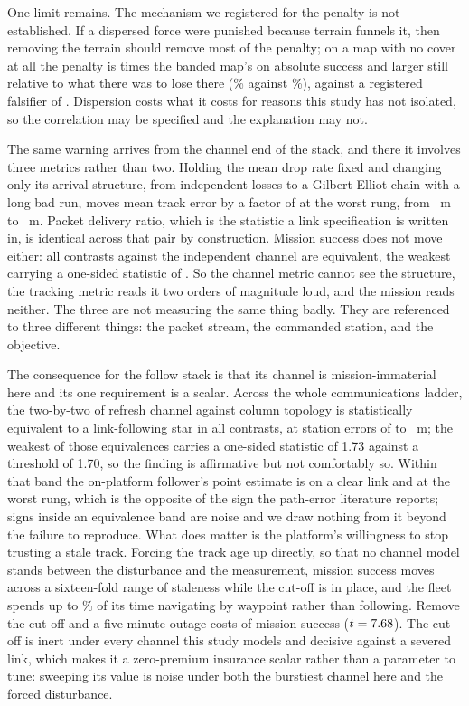\documentclass[11pt]{article}
\begin{document}
One limit remains. The mechanism we registered for the penalty is not established. If a
dispersed force were punished because terrain funnels it, then removing the terrain should remove
most of the penalty; on a map with no cover at all the penalty is \DcWideRatio{} times the banded
map's on absolute success and larger still relative to what there was to lose there
(\DcWideRelOpen\% against \DcWideRelBand\%), against a registered falsifier of \DcNeeded{}. Dispersion
costs what it costs for reasons this study has not isolated, so the correlation may be specified and
the explanation may not.

The same warning arrives from the channel end of the stack, and there it involves three metrics
rather than two. Holding the mean drop rate fixed and changing only its arrival structure, from
independent losses to a Gilbert-Elliot chain with a long bad run, moves mean track error by a factor
of \FoBurstRatio{} at the worst rung, from \FoBurstTrkIid{}~m to \FoBurstTrkGe{}~m. Packet delivery
ratio, which is the statistic a link specification is written in, is identical across that pair by
construction. Mission success does not move either: all \FoBurstCells{} contrasts against the
independent channel are equivalent, the weakest carrying a one-sided statistic of \FoBurstTost{}.
So the channel metric cannot see the structure, the tracking metric reads it two orders of magnitude
loud, and the mission reads neither. The three are not measuring the same thing badly. They are
referenced to three different things: the packet stream, the commanded station, and the objective.

The consequence for the follow stack is that its channel is mission-immaterial here and its one
requirement is a scalar. Across the whole communications ladder, the two-by-two of refresh channel
against column topology is statistically equivalent to a link-following star in all \FoCells{}
contrasts, at station errors of \FoStErrClear{} to \FoStErrSevere{}~m; the weakest of those
equivalences carries a one-sided statistic of 1.73 against a threshold of 1.70, so the finding is
affirmative but not comfortably so. Within that band the on-platform follower's point estimate is
\FoGapClear{} on a clear link and \FoGapSevere{} at the worst rung, which is the opposite of the
sign the path-error literature reports; signs inside an equivalence band are noise and we draw
nothing from it beyond the failure to reproduce. What does matter is the platform's willingness to
stop trusting a stale track. Forcing the track age up directly, so that no channel model stands
between the disturbance and the measurement, mission success moves \FoCutSpread{} across a
sixteen-fold range of staleness while the cut-off is in place, and the fleet spends up to
\FoLostWorst\% of its time navigating by waypoint rather than following. Remove the cut-off and a
five-minute outage costs \FoCutGain{} of mission success ($t = 7.68{}$). The cut-off is inert
under every channel this study models and decisive against a severed link, which makes it a
zero-premium insurance scalar rather than a parameter to tune: sweeping its value is noise under
both the burstiest channel here and the forced disturbance.
\end{document}
